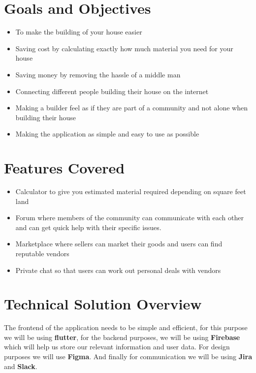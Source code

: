 \documentclass{article}
\begin{document}
\section*{Goals and Objectives}

\begin{itemize}
    \item To make the building of your house easier
    \item Saving cost by calculating exactly how much material you need for your house
    \item Saving money by removing the hassle of a middle man
    \item Connecting different people building their house on the internet
    \item Making a builder feel as if they are part of a community and not alone when building their house
    \item Making the application as simple and easy to use as possible
\end{itemize}

\section*{Features Covered}
\begin{itemize}
    \item Calculator to give you estimated material required depending on square feet land
    \item Forum where members of the community can communicate with each other and can get quick help with their specific issues.
    \item Marketplace where sellers can market their goods and users can find reputable vendors
    \item Private chat so that users can work out personal deals with vendors
\end{itemize}


\section*{Technical Solution Overview}

The frontend of the application needs to be simple and efficient, for this purpose we will be using \textbf{flutter}, for the backend purposes, we will be using
\textbf{Firebase} which will help us store our relevant information and user data. For design purposes we will use \textbf{Figma}. And finally for communication
we will be using \textbf{Jira} and \textbf{Slack}. 
\end{document}
